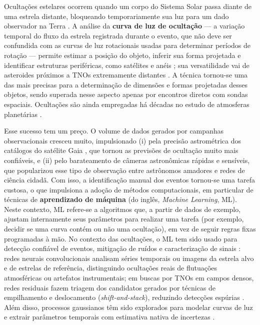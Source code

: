 \documentclass[msc]{on} %
\begin{document}
Ocultações estelares ocorrem quando um corpo do Sistema Solar passa diante de uma estrela distante, bloqueando temporariamente sua luz para um dado observador na Terra \citep{Ortiz2020, Knieling2024}. A análise da \textbf{curva de luz de ocultação} --- a variação temporal do fluxo da estrela registrada durante o evento, que não deve ser confundida com as curvas de luz rotacionais usadas para determinar períodos de rotação --- permite estimar a posição do objeto, inferir sua forma projetada e identificar estruturas periféricas, como satélites e anéis \citep{Cazeneuve2023}; sua versatilidade vai de asteroides próximos a TNOs extremamente distantes \citep{Fraser2024}. A técnica tornou-se uma das mais precisas para a determinação de dimensões e formas projetadas desses objetos, sendo superada nesse aspecto apenas por encontros diretos com sondas espaciais. Ocultações são ainda empregadas há décadas no estudo de atmosferas planetárias \citep{Zhu2022}. 

Esse sucesso tem um preço. O volume de dados gerados por campanhas observacionais cresceu muito, impulsionado (i) pela precisão astrométrica dos catálogos do satélite Gaia \citep{Gaia2016, GaiaDR3}, que tornou as previsões de ocultação muito mais confiáveis, e (ii) pelo barateamento de câmeras astronômicas rápidas e sensíveis, que popularizou esse tipo de observação entre astrônomos amadores e redes de ciência cidadã. Com isso, a identificação manual dos eventos tornou-se uma tarefa custosa, o que impulsiona a adoção de métodos computacionais, em particular de técnicas de \textbf{aprendizado de máquina} (do inglês, \textit{Machine Learning}, ML). Neste contexto, ML refere-se a algoritmos que, a partir de dados de exemplo, ajustam internamente seus parâmetros para realizar uma tarefa (por exemplo, decidir se uma curva contém ou não uma ocultação), em vez de seguir regras fixas programadas à mão. No contexto das ocultações, o ML tem sido usado para detecção confiável de eventos, mitigação de ruídos e caracterização de sinais \citep{Cazeneuve2023}: redes neurais convolucionais \citep[como a ODNet,][]{Cazeneuve2023} analisam séries temporais ou imagens da estrela alvo e de estrelas de referência, distinguindo ocultações reais de flutuações atmosféricas ou artefatos instrumentais; em buscas por TNOs em campos densos, redes residuais fazem triagem dos candidatos gerados por técnicas de empilhamento e deslocamento (\textit{shift-and-stack}), reduzindo detecções espúrias \citep{Fraser2024}. Além disso, processos gaussianos têm sido explorados para modelar curvas de luz e extrair parâmetros temporais com estimativa nativa de incertezas \citep{Knieling2024, Deisenroth2019}.
\end{document}
